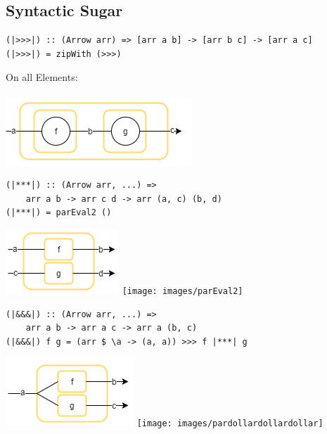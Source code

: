 \subsection{Syntactic Sugar}
\begin{frame}[fragile]
\begin{lstlisting}[frame=htrbl]
(|>>>|) :: (Arrow arr) => [arr a b] -> [arr b c] -> [arr a c]
(|>>>|) = zipWith (>>>)
\end{lstlisting}
\begin{center}
On all Elements:\\~\\
\includegraphics[scale=0.5]{images/compose}
\end{center}

\begin{lstlisting}[frame=htrbl]
(|***|) :: (Arrow arr, ...) =>
	arr a b -> arr c d -> arr (a, c) (b, d)
(|***|) = parEval2 ()
\end{lstlisting}
\begin{center}
\includegraphics[scale=0.5]{images/starstarstar}
\hspace{2em}
\texttt{[image: images/parEval2]}
\end{center}
\end{frame}

\begin{frame}[fragile]
\begin{lstlisting}[frame=htrbl]
(|&&&|) :: (Arrow arr, ...) =>
	arr a b -> arr a c -> arr a (b, c)
(|&&&|) f g = (arr $ \a -> (a, a)) >>> f |***| g
\end{lstlisting}
\begin{center}
\includegraphics[scale=0.5]{images/dollardollardollar}
\hspace{2em}
\texttt{[image: images/pardollardollardollar]}
\end{center}
\end{frame}

